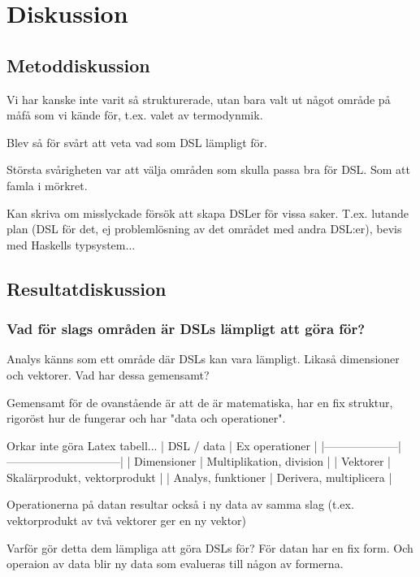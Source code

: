 
\chapter{Diskussion}

\begin{binge}
\section{Metoddiskussion}

Vi har kanske inte varit så strukturerade, utan bara valt ut något område på måfå som vi kände för, t.ex. valet av termodynmik.

Blev så för svårt att veta vad som DSL lämpligt för.

Största svårigheten var att välja områden som skulla passa bra för DSL. Som att
famla i mörkret.

Kan skriva om misslyckade försök att skapa DSLer för vissa saker. T.ex. lutande plan (DSL för det, ej problemlösning av det området med andra DSL:er), bevis med Haskells typsystem...

\section{Resultatdiskussion}

\subsection{Vad för slags områden är DSLs lämpligt att göra för?}

Analys känns som ett område där DSLs kan vara lämpligt. Likaså dimensioner och
vektorer. Vad har dessa gemensamt?

Gemensamt för de ovanstående är att de är matematiska, har en fix struktur,
rigoröst hur de fungerar och har "data och operationer".

Orkar inte göra Latex tabell...
| DSL / data         | Ex operationer               |
|--------------------|------------------------------|
| Dimensioner        | Multiplikation, division     |
| Vektorer           | Skalärprodukt, vektorprodukt |
| Analys, funktioner | Derivera, multiplicera       |

Operationerna på datan resultar också i ny data av samma slag (t.ex.
vektorprodukt av två vektorer ger en ny vektor)

Varför gör detta dem lämpliga att göra DSLs för? För datan har en fix form. Och
operaion av data blir ny data som evalueras till någon av formerna.


\end{binge}
